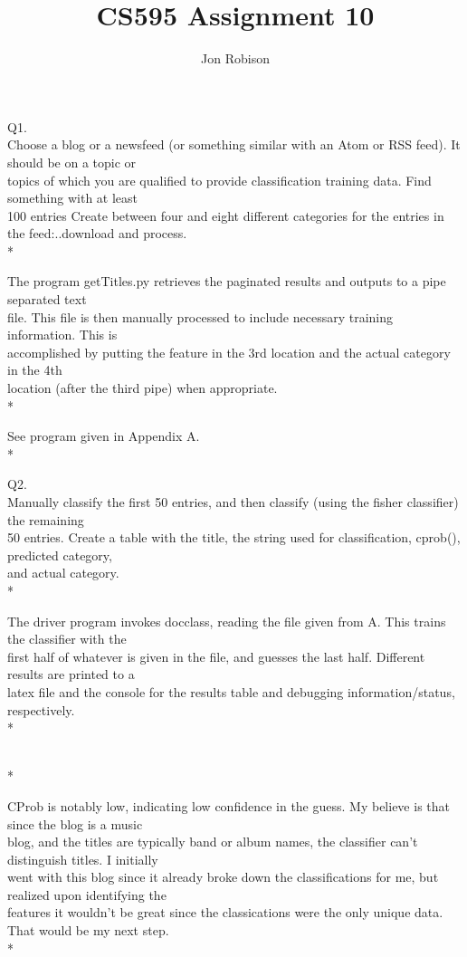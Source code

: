 \documentclass{article}
\begin{document}
\author{Jon Robison}
\title{CS595 Assignment 10}
\maketitle

Q1.\\
Choose a blog or a newsfeed (or something similar with an Atom or RSS feed).  It should be on a topic or\\
topics of which you are qualified to provide classification training data. Find something with at least \\
100 entries Create between four and eight different categories for the entries in the feed:..download and process.\\*

The program getTitles.py retrieves the paginated results and outputs to a pipe separated text\\
file. This file is then manually processed to include necessary training information. This is \\
accomplished by putting the feature in the 3rd location and the actual category in the 4th \\
location (after the third pipe) when appropriate.\\*

See program given in Appendix A.\\*

Q2.\\
Manually classify the first 50 entries, and then classify (using the fisher classifier) the remaining\\
50 entries. Create a table with the title, the string used for classification, cprob(), predicted category,\\
and actual category.\\*

The driver program invokes docclass, reading the file given from A. This trains the classifier with the\\
first half of whatever is given in the file, and guesses the last half. Different results are printed to a\\
latex file and the console for the results table and debugging information/status, respectively.\\*


\\*

CProb is notably low, indicating low confidence in the guess. My believe is that since the blog is a music\\
blog, and the titles are typically band or album names, the classifier can't distinguish titles. I initially\\
went with this blog since it already broke down the classifications for me, but realized upon identifying the\\
features it wouldn't be great since the classications were the only unique data. That would be my next step.\\*
\end{document}
